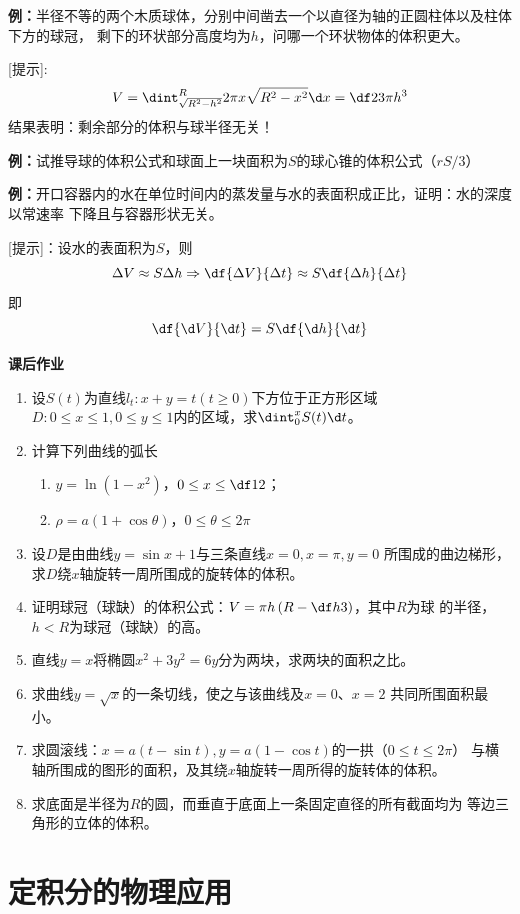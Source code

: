 {\bf 例：}半径不等的两个木质球体，分别中间凿去一个以直径为轴的正圆柱体以及柱体下方的球冠，
剩下的环状部分高度均为$h$，问哪一个环状物体的体积更大。

[提示]:
$$V=\dint_{\sqrt{R^2-h^2}}^R2\pi x\sqrt{R^2-x^2}\d x=\df23\pi h^3$$
结果表明：剩余部分的体积与球半径无关！

{\bf 例：}试推导球的体积公式和球面上一块面积为$S$的球心锥的体积公式（$rS/3$）

{\bf 例：}开口容器内的水在单位时间内的蒸发量与水的表面积成正比，证明：水的深度以常速率
下降且与容器形状无关。

[提示]：设水的表面积为$S$，则
$$\Delta V\approx S\Delta h\Rightarrow
\df{\Delta V}{\Delta t}\approx S\df{\Delta h}{\Delta t}$$
即
$$\df{\d V}{\d t}=S\df{\d h}{\d t}$$

\begin{ext}
	{\bf 课后作业}
	\begin{enumerate}
	  \item 设$S(t)$为直线$l_t:x+y=t(t\geq0)$下方位于正方形区域
	  $D:0\leq x\leq 1,0\leq y\leq 1$内的区域，求$\dint_0^xS(t)\d t$。
	  \item 计算下列曲线的弧长
	  \begin{enumerate}[(1)]
	    \item $y=\ln(1-x^2)$，$0\leq x\leq\df12$；
	    \item $\rho=a(1+\cos\theta)$，$0\leq\theta\leq2\pi$
	  \end{enumerate}
	  \item 设$D$是由曲线$y=\sin x+1$与三条直线$x=0,x=\pi,y=0$
	  所围成的曲边梯形，求$D$绕$x$轴旋转一周所围成的旋转体的体积。
	  \item 证明球冠（球缺）的体积公式：$V=\pi h\left(R-\df h3\right)$，其中$R$为球
	  的半径，$h<R$为球冠（球缺）的高。
	  \item 直线$y=x$将椭圆$x^2+3y^2=6y$分为两块，求两块的面积之比。
	  \item 求曲线$y=\sqrt x$的一条切线，使之与该曲线及$x=0$、$x=2$
	  共同所围面积最小。
	  \item 求圆滚线：$x=a(t-\sin t),y=a(1-\cos t)$的一拱（$0\leq t\leq 2\pi$）
	  与横轴所围成的图形的面积，及其绕$x$轴旋转一周所得的旋转体的体积。
	  \item 求底面是半径为$R$的圆，而垂直于底面上一条固定直径的所有截面均为
	  等边三角形的立体的体积。
	\end{enumerate}
\end{ext}

\section{定积分的物理应用}

